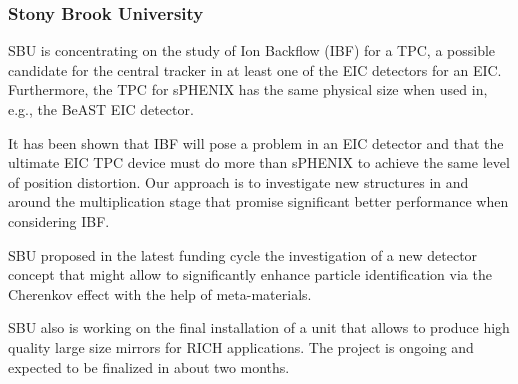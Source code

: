 \subsubsection{Stony Brook University} 
SBU is concentrating on the study of Ion Backflow (IBF) for a TPC, a possible candidate for the central tracker in at least one of the EIC detectors for an EIC. Furthermore, the TPC for sPHENIX has the same physical size when used in, e.g., the BeAST EIC detector. 

It has been shown that IBF will pose a problem in an EIC detector and that the ultimate EIC TPC device must do more than sPHENIX to achieve the same level of position distortion. Our approach is to investigate new structures in and around the multiplication stage that promise significant better performance when considering IBF.

SBU proposed in the latest funding cycle the investigation of a new detector concept that might allow to significantly enhance particle identification via the Cherenkov effect with the help of meta-materials.

SBU also is working on the final installation of a unit that allows to produce high quality large size mirrors for RICH applications. The project is ongoing and expected to be finalized in about two months.